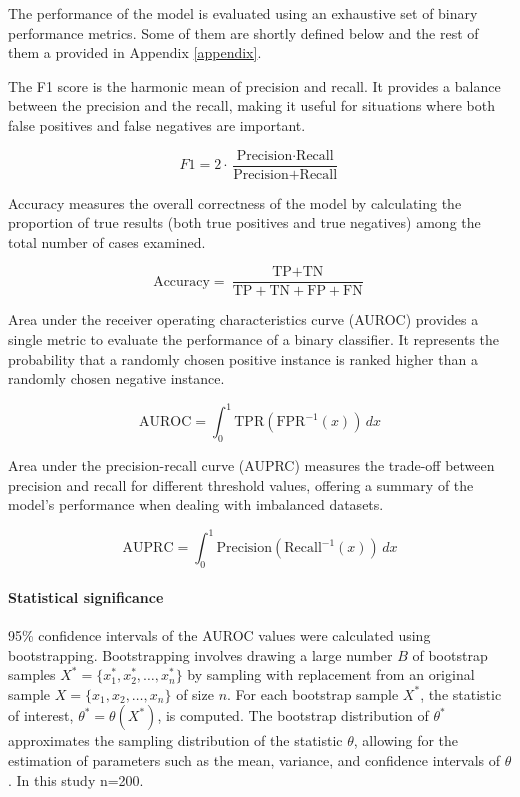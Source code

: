 The performance of the model is evaluated using an exhaustive set of binary performance metrics. Some of them are shortly defined below and the rest of them a provided in Appendix \ref{appendix}.

The F1 score is the harmonic mean of precision and recall. It provides a balance between the precision and the recall, making it useful for situations where both false positives and false negatives are important.

\begin{equation}
F1 = 2 \cdot \frac{\text{Precision} \cdot \text{Recall}}{\text{Precision} + \text{Recall}}
\end{equation}

Accuracy measures the overall correctness of the model by calculating the proportion of true results (both true positives and true negatives) among the total number of cases examined.

\begin{equation}
\text{Accuracy} = \frac{\text{TP} + \text{TN}}{\text{TP} + \text{TN} + \text{FP} + \text{FN}}
\end{equation}

Area under the receiver operating characteristics curve (AUROC) provides a single metric to evaluate the performance of a binary classifier. It represents the probability that a randomly chosen positive instance is ranked higher than a randomly chosen negative instance.

\begin{equation}
\text{AUROC} = \int_0^1 \text{TPR}(\text{FPR}^{-1}(x)) \, dx
\end{equation}

Area under the precision-recall curve (AUPRC) measures the trade-off between precision and recall for different threshold values, offering a summary of the model’s performance when dealing with imbalanced datasets.

\begin{equation}
\text{AUPRC} = \int_0^1 \text{Precision}(\text{Recall}^{-1}(x)) \, dx
\end{equation}

\paragraph{Statistical significance}

95\% confidence intervals of the AUROC values were calculated using bootstrapping. Bootstrapping involves drawing a large number \( B \) of bootstrap samples \( X^* = \{x_1^*, x_2^*, \ldots, x_n^*\} \) by sampling with replacement from an original sample \( X = \{x_1, x_2, \ldots, x_n\} \) of size \( n \). For each bootstrap sample \( X^* \), the statistic of interest, \( \theta^* = \theta(X^*) \), is computed. The bootstrap distribution of \( \theta^* \) approximates the sampling distribution of the statistic \( \theta \), allowing for the estimation of parameters such as the mean, variance, and confidence intervals of \( \theta \). In this study n=200.

